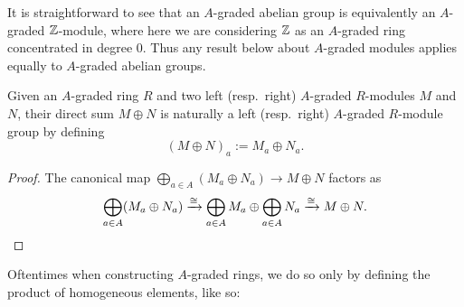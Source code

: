 \documentclass[../main.tex]{subfiles}
\begin{document}
\begin{remark}
	It is straightforward to see that an $A$-graded abelian group is equivalently an $A$-graded $\mathbb{Z}$-module, where here we are considering $\mathbb{Z}$ as an $A$-graded ring concentrated in degree $0$. Thus any result below about $A$-graded modules applies equally to $A$-graded abelian groups.
\end{remark}

\begin{lemma}\label{product_of_A_graded}
	Given an $A$-graded ring $R$ and two left (resp.\ right) $A$-graded $R$-modules $M$ and $N$, their direct sum $M\oplus N$ is naturally a left (resp.\ right) $A$-graded $R$-module group by defining
	\[(M\oplus N)_a:=M_a\oplus N_a.\]
\end{lemma}
\begin{proof}
	The canonical map $\bigoplus_{a\in A}(M_a\oplus N_a)\to M\oplus N$ factors as
	\[\bigoplus_{a\in A}(M_a\oplus N_a)\xrightarrow\cong\bigoplus_{a\in A}M_a\oplus\bigoplus_{a\in A}N_a\xrightarrow\cong M\oplus N.\qedhere\]
\end{proof}

Oftentimes when constructing $A$-graded rings, we do so only by defining the product of homogeneous elements, like so:
\end{document}

